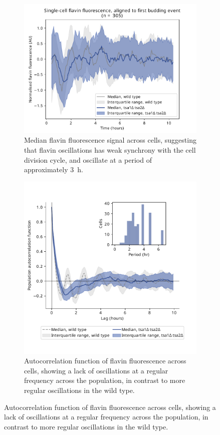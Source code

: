 \begin{figure}
  \centering
  \begin{subfigure}[t]{0.45\textwidth}
   \centering
   \includegraphics[width=\textwidth]{tsa1tsa2morgan_1649_6.pdf}
   \caption{
     Median flavin fluorescence signal across cells,%
     suggesting that flavin oscillations has weak synchrony with the cell division cycle, and oscillate at a period of approximately \SI{3}{\hour}.
   }
   \label{fig:biology-tsa1tsa2-median}
  \end{subfigure}%
  \begin{subfigure}[t]{0.45\textwidth}
   \centering
   \includegraphics[width=\textwidth]{tsa1tsa2morgan_1649_12.pdf}
   \caption{
    Autocorrelation function of flavin fluorescence across cells, showing a lack of oscillations at a regular frequency across the population, in contrast to more regular oscillations in the wild type.
   }
   \label{fig:biology-tsa1tsa2-median}
  \end{subfigure}


\end{figure}
